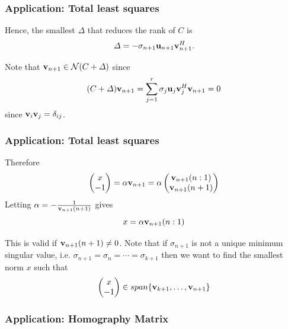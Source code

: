 \documentclass{beamer}
\begin{document}
\begin{frame}\frametitle{Application:  Total least squares}
	Hence, the smallest $\Delta$ that reduces the rank of $C$ is 
	\[
		\Delta = -\sigma_{n+1}\mathbf{u}_{n+1}\mathbf{v}_{n+1}^H.
	\]
	
	\vfill
	
	Note that $\mathbf{v}_{n+1} \in \mathcal{N}(C+\Delta)$ 
	since
	\[ 
		(C+\Delta)\mathbf{v}_{n+1} 
			= \sum_{j=1}^r\sigma_j\mathbf{u}_j\mathbf{v}_j^H\mathbf{v}_{n+1} 
			= 0
	\]
	since $\mathbf{v}_i\mathbf{v}_j = \delta_{ij}$. 
\end{frame}

\begin{frame}\frametitle{Application:  Total least squares}
	Therefore
	\begin{align*}
		\begin{pmatrix}
	    	x\\ -1
	  	\end{pmatrix} 
	  		= \alpha \mathbf{v}_{n+1} 
	  		= \alpha \begin{pmatrix}
	    				\mathbf{v}_{n+1}(n:1)\\
	    				\mathbf{v}_{n+1}(n+1)
	  			 	  \end{pmatrix}
	\end{align*}
	Letting $\alpha = -\frac{1}{\mathbf{v}_{n+1}(n+1)}$ gives
	\[
	x = \alpha \mathbf{v}_{n+1}(n:1)
	\]
	
	\vfill
	
	This is valid if $\mathbf{v}_{n+1}(n+1) \neq 0$.  Note that if $\sigma_{n+1}$ is not a unique minimum singular value, i.e. $\sigma_{n+1} = \sigma_n = \cdots = \sigma_{k+1}$ then we want to find the smallest norm $x$ such that
	\[ 
	\begin{pmatrix}
	    x\\ -1
	  \end{pmatrix} \in span\{ \mathbf{v}_{k+1},\ldots,\mathbf{v}_{n+1} \} 
	 \]	
\end{frame}

\begin{frame}\frametitle{Application:  Homography Matrix}
	
\end{frame}
\end{document}
